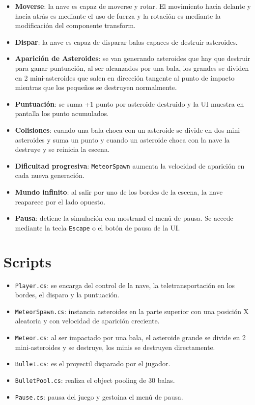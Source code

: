 \documentclass[12pt,twoside,letterpaper]{article}
\begin{document}
\begin{itemize}
    \item \textbf{Moverse}: la nave es capaz de moverse y rotar. El movimiento hacia delante y hacia atrás es mediante el uso de fuerza y la rotación es mediante la modificación del componente transform.
    \item \textbf{Dispar}: la nave es capaz de disparar balas capaces de destruir asteroides.
    \item \textbf{Aparición de Asteroides}: se van generando asteroides que hay que destruir para ganar puntuación, al ser alcanzados por una bala, los grandes se dividen en 2 mini-asteroides que salen en dirección tangente al punto de impacto mientras que los pequeños se destruyen normalmente.
    \item \textbf{Puntuación}: se suma +1 punto por asteroide destruido y la UI muestra en pantalla los punto acumulados.
    \item \textbf{Colisiones}: cuando una bala choca con un asteroide se divide en dos mini-asteroides y suma un punto y cuando un asteroide choca con la nave la destruye y se reinicia la escena.
    \item \textbf{Dificultad progresiva}: \texttt{MeteorSpawn} aumenta la velocidad de aparición en cada nueva generación.
    \item \textbf{Mundo infinito}: al salir por uno de los bordes de la escena, la nave reaparece por el lado opuesto.
    \item \textbf{Pausa}: detiene la simulación con mostrand el menú de pausa. Se accede mediante la tecla \texttt{Escape} o el botón de pausa de la UI.
\end{itemize}

\section{Scripts}

\begin{itemize}
    \item \texttt{Player.cs}: se encarga del control de la nave, la teletransportación en los bordes, el disparo y la puntuación.
    \item \texttt{MeteorSpawn.cs}: instancia asteroides en la parte superior con una posición X aleatoria y con velocidad de aparición creciente.
    \item \texttt{Meteor.cs}: al ser impactado por una bala, el asteroide grande se divide en 2 mini-asteroides y se destruye, los minis se destruyen directamente.
    \item \texttt{Bullet.cs}: es el proyectil disparado por el jugador.
    \item \texttt{BulletPool.cs}: realiza el object pooling de 30 balas. 
    \item \texttt{Pause.cs}: pausa del juego y gestoina el menú de pausa.
\end{itemize}
\end{document}
